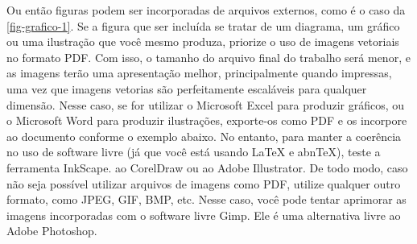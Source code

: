 Ou então figuras podem ser incorporadas de arquivos externos, como é o caso da \autoref{fig-grafico-1}. Se a figura que ser incluída se tratar de um diagrama, um gráfico ou uma ilustração que você mesmo produza, priorize o uso de imagens vetoriais no formato PDF. Com isso, o tamanho do arquivo final do trabalho será menor, e as imagens terão uma apresentação melhor, principalmente quando impressas, uma vez que imagens vetorias são perfeitamente escaláveis para qualquer dimensão. Nesse caso, se for utilizar o Microsoft Excel para produzir gráficos, ou o Microsoft Word para produzir ilustrações, exporte-os como PDF e os incorpore ao documento conforme o exemplo abaixo. No entanto, para manter a coerência no uso de software livre (já que você está usando LaTeX e abnTeX),  teste a ferramenta InkScape. ao CorelDraw ou ao Adobe Illustrator.  De todo modo, caso não seja possível  utilizar arquivos de imagens como PDF, utilize qualquer outro formato, como JPEG, GIF, BMP, etc.  Nesse caso, você pode tentar aprimorar as imagens incorporadas com o software livre Gimp. Ele é uma alternativa livre ao Adobe Photoshop.